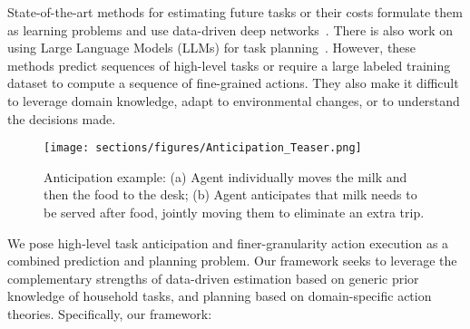 \indent State-of-the-art methods for estimating future tasks or their costs formulate them as learning problems and use data-driven deep networks~\cite{8460924,dhakal2023anticipatory}. There is also work on using Large Language Models (LLMs) for task planning~\cite{pmlr-v205-huang23c,ding2023task,lin2023text2motion}. However, these methods predict sequences of high-level tasks or require a large labeled training dataset to compute a sequence of fine-grained actions. %
They also make it difficult to leverage domain knowledge, adapt to environmental changes, or to understand the decisions made.\\
\begin{figure}[tb]
\centering
\captionsetup{font=scriptsize}
\setlength{\belowcaptionskip}{-10pt}
\texttt{[image: sections/figures/Anticipation\_Teaser.png]}
\caption{Anticipation example: (a) Agent individually moves the milk and then the food to the desk; (b) Agent anticipates that milk needs to be served after food, jointly moving them to eliminate an extra trip.}
\vspace{-6pt}
\label{fig:teaser}
\end{figure}
\indent We pose high-level task anticipation and finer-granularity action execution as a combined prediction and planning problem. Our framework seeks to leverage the complementary strengths of data-driven estimation based on generic prior knowledge of household tasks, and planning based on domain-specific action theories. Specifically, our framework: %
